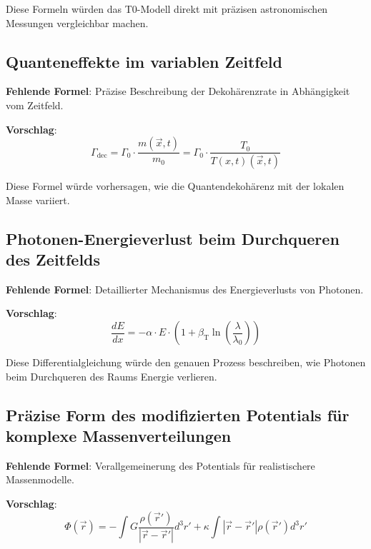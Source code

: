 \documentclass[12pt,a4paper]{article}
\newcommand{\Tfieldt}{T(x,t)}
\newcommand{\betaT}{\beta_{\text{T}}}
\newcommand{\vecx}{\vec{x}}
\begin{document}
	Diese Formeln würden das T0-Modell direkt mit präzisen astronomischen Messungen vergleichbar machen.
	
	\subsection{Quanteneffekte im variablen Zeitfeld}
	\label{subsec:quantum_effects}
	
	\textbf{Fehlende Formel}: Präzise Beschreibung der Dekohärenzrate in Abhängigkeit vom Zeitfeld.
	
	\textbf{Vorschlag}:
	\begin{equation}
		\Gamma_{\text{dec}} = \Gamma_0 \cdot \frac{m(\vecx,t)}{m_0} = \Gamma_0 \cdot \frac{T_0}{\Tfieldt(\vecx,t)}
	\end{equation}
	
	Diese Formel würde vorhersagen, wie die Quantendekohärenz mit der lokalen Masse variiert.
	
	\subsection{Photonen-Energieverlust beim Durchqueren des Zeitfelds}
	\label{subsec:photon_energy_loss}
	
	\textbf{Fehlende Formel}: Detaillierter Mechanismus des Energieverlusts von Photonen.
	
	\textbf{Vorschlag}:
	\begin{equation}
		\frac{dE}{dx} = -\alpha \cdot E \cdot \left(1 + \betaT \ln\left(\frac{\lambda}{\lambda_0}\right)\right)
	\end{equation}
	
	Diese Differentialgleichung würde den genauen Prozess beschreiben, wie Photonen beim Durchqueren des Raums Energie verlieren.
	
	\subsection{Präzise Form des modifizierten Potentials für komplexe Massenverteilungen}
	\label{subsec:modified_potential}
	
	\textbf{Fehlende Formel}: Verallgemeinerung des Potentials für realistischere Massenmodelle.
	
	\textbf{Vorschlag}:
	\begin{equation}
		\Phi(\vec{r}) = -\int G \frac{\rho(\vec{r}')}{|\vec{r}-\vec{r}'|} d^3r' + \kappa\int|\vec{r}-\vec{r}'|\rho(\vec{r}')d^3r'
	\end{equation}
	
\end{document}
